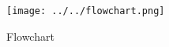 \begin{center}
    \begin{figure}[]
        \caption{Flowchart}
        \texttt{[image: ../../flowchart.png]}
    \end{figure}
\end{center}
